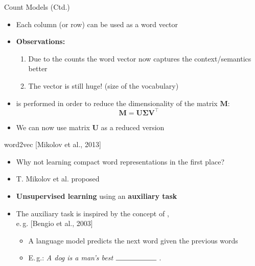 \begin{frame}{Count Models (Ctd.)}{}
	\begin{itemize}
		\item Each column (or row) can be used as a word vector
		\item \textbf{Observations:}
		\begin{enumerate}
			\item Due to the counts the word vector now captures the context/semantics better
			\item The vector is still huge! (size of the vocabulary)
		\end{enumerate}
		\item {} is performed in order to reduce the dimensionality of the
			matrix $\bm{M}$:
		\begin{equation*}
			\bm{M} = \bm{U} \bm{\Sigma} \bm{V}^{\intercal}
		\end{equation*}
		\item We can now use matrix $\bm{U}$ as a reduced version
	\end{itemize}
\end{frame}


\begin{frame}{word2vec [Mikolov et al., 2013]}{}
	\begin{itemize}
		\item Why not learning compact word representations in the first place?
		\item T. Mikolov et al. proposed 
		\item \textbf{Unsupervised learning} using an \textbf{auxiliary task}
		\item The auxiliary task is inspired by the concept of , \\ e.\,g. [Bengio et al., 2003]
		\begin{itemize}
			\item A language model predicts the next word given the previous words
			\item E.\,g.: \textit{A dog is a man's best} $\rule{2cm}{0.15mm}$ .
		\end{itemize} 
	\end{itemize}
\end{frame}


